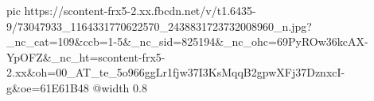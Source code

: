  
 
 
 
 

\ifcmt
  pic https://scontent-frx5-2.xx.fbcdn.net/v/t1.6435-9/73047933_1164331770622570_2438831723732008960_n.jpg?_nc_cat=109&ccb=1-5&_nc_sid=825194&_nc_ohc=69PyROw36kcAX-YpOFZ&_nc_ht=scontent-frx5-2.xx&oh=00_AT_te_5o966ggLr1fjw37I3KsMqqB2gpwXFj37DznxcI-g&oe=61E61B48
  @width 0.8
\fi
